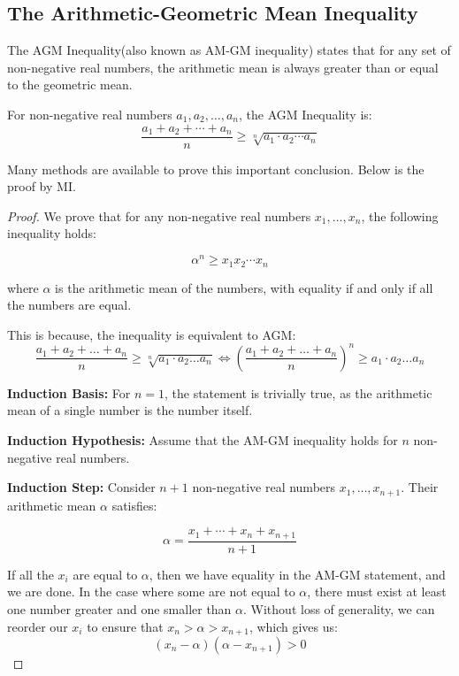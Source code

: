 \documentclass[
	12pt, %
	fleqn, %
	a4paper, %
]{LegrandOrangeBook}
\begin{document}
    \subsection{The Arithmetic-Geometric Mean Inequality}
    The AGM Inequality(also known as AM-GM inequality) states that for any set of non-negative real numbers, the arithmetic mean is always greater than or equal to the geometric mean.
    \begin{definition} \label{AGM}
        For non-negative real numbers \( a_1, a_2, \ldots, a_n \), the AGM Inequality is:
        \[ \frac{a_1 + a_2 + \cdots + a_n}{n} \geq \sqrt[n]{a_1 \cdot a_2 \cdots a_n} \]
    \end{definition}
    Many methods are available to prove this important conclusion. Below is the proof by MI.
    \begin{proof}
        We prove that for any non-negative real numbers \(x_1, \ldots, x_n\), the following inequality holds:

\[
\alpha^n \geq x_1 x_2 \cdots x_n
\]

where \( \alpha \) is the arithmetic mean of the numbers, with equality if and only if all the numbers are equal.
\begin{remark}
    This is because, the inequality is equivalent to AGM:
    $$\frac{a_{1} +a_{2} +\dotsc +a_{n}}{n} \geq \sqrt[n]{a_{1} \cdot a_{2} \dotsc a_{n}} \Longleftrightarrow \left(\frac{a_{1} +a_{2} +\dotsc +a_{n}}{n}\right)^{n} \geq a_{1} \cdot a_{2} \dotsc a_{n}$$

\end{remark}
\textbf{Induction Basis:}
For \(n = 1\), the statement is trivially true, as the arithmetic mean of a single number is the number itself.

\noindent \textbf{Induction Hypothesis:}
Assume that the AM-GM inequality holds for \(n\) non-negative real numbers.

\noindent \textbf{Induction Step:}
Consider \(n+1\) non-negative real numbers \(x_1, \ldots, x_{n+1}\). Their arithmetic mean \( \alpha \) satisfies:

\[
\alpha = \frac{x_1 + \cdots + x_n + x_{n+1}}{n+1}
\]

If all the \(x_i\) are equal to \( \alpha \), then we have equality in the AM-GM statement, and we are done. In the case where some are not equal to \( \alpha \), there must exist at least one number greater and one smaller than \( \alpha \). Without loss of generality, we can reorder our \(x_i\) to ensure that \(x_n > \alpha > x_{n+1}\), which gives us:
\begin{equation}
    (x_n - \alpha)(\alpha - x_{n+1}) > 0 \label{agm1}
\end{equation}



\end{proof}
\end{document}
